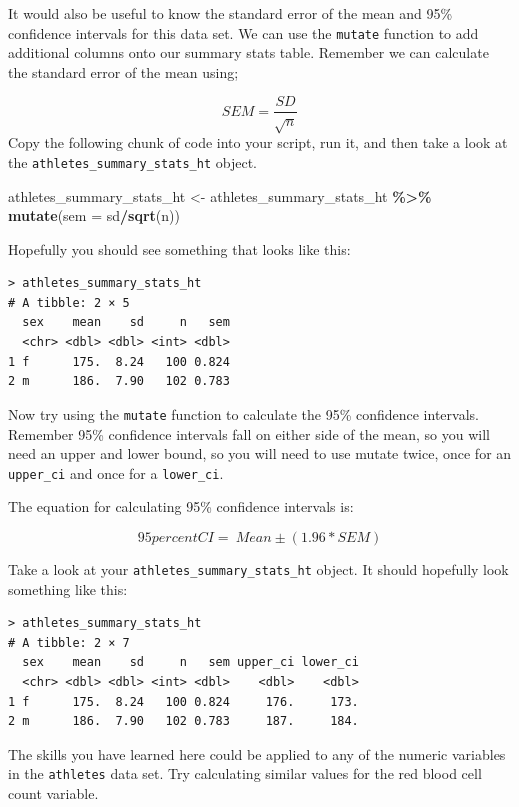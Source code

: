 \documentclass[
]{book}
\newenvironment{Shaded}{\begin{snugshade}}{\end{snugshade}}
\newcommand{\AttributeTok}[1]{\textcolor[rgb]{0.13,0.29,0.53}{#1}}
\newcommand{\FunctionTok}[1]{\textcolor[rgb]{0.13,0.29,0.53}{\textbf{#1}}}
\newcommand{\NormalTok}[1]{#1}
\newcommand{\OtherTok}[1]{\textcolor[rgb]{0.56,0.35,0.01}{#1}}
\newcommand{\SpecialCharTok}[1]{\textcolor[rgb]{0.81,0.36,0.00}{\textbf{#1}}}
\begin{document}
It would also be useful to know the standard error of the mean and 95\% confidence intervals for this data set. We can use the \texttt{mutate} function to add additional columns onto our summary stats table. Remember we can calculate the standard error of the mean using;

\[
SEM = \frac{SD}{\sqrt{n}}
\]
Copy the following chunk of code into your script, run it, and then take a look at the \texttt{athletes\_summary\_stats\_ht} object.

\begin{Shaded}
\begin{Highlighting}[]
\NormalTok{athletes\_summary\_stats\_ht }\OtherTok{\textless{}{-}}\NormalTok{ athletes\_summary\_stats\_ht }\SpecialCharTok{\%\textgreater{}\%}
  \FunctionTok{mutate}\NormalTok{(}\AttributeTok{sem =}\NormalTok{ sd}\SpecialCharTok{/}\FunctionTok{sqrt}\NormalTok{(n))}
\end{Highlighting}
\end{Shaded}

Hopefully you should see something that looks like this:

\begin{verbatim}
> athletes_summary_stats_ht
# A tibble: 2 × 5
  sex    mean    sd     n   sem 
  <chr> <dbl> <dbl> <int> <dbl>
1 f      175.  8.24   100 0.824
2 m      186.  7.90   102 0.783 
\end{verbatim}

Now try using the \texttt{mutate} function to calculate the 95\% confidence intervals. Remember 95\% confidence intervals fall on either side of the mean, so you will need an upper and lower bound, so you will need to use mutate twice, once for an \texttt{upper\_ci} and once for a \texttt{lower\_ci}.

The equation for calculating 95\% confidence intervals is:

\[
95percent CI = \ Mean ± (1.96 * SEM)
\]

Take a look at your \texttt{athletes\_summary\_stats\_ht} object. It should hopefully look something like this:

\begin{verbatim}
> athletes_summary_stats_ht
# A tibble: 2 × 7
  sex    mean    sd     n   sem upper_ci lower_ci
  <chr> <dbl> <dbl> <int> <dbl>    <dbl>    <dbl>
1 f      175.  8.24   100 0.824     176.     173.
2 m      186.  7.90   102 0.783     187.     184.
\end{verbatim}

The skills you have learned here could be applied to any of the numeric variables in the \texttt{athletes} data set. Try calculating similar values for the red blood cell count variable.
\end{document}
